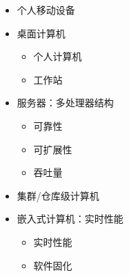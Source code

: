 \documentclass[cn, hazy, blue, normal, 12pt]{elegantnote}
\begin{document}
\begin{itemize}
    \item 个人移动设备
    \item 桌面计算机
          \begin{itemize}
              \item 个人计算机
              \item 工作站
          \end{itemize}
    \item 服务器：多处理器结构
          \begin{itemize}
              \item 可靠性
              \item 可扩展性
              \item 吞吐量
          \end{itemize}
    \item 集群/仓库级计算机
    \item 嵌入式计算机：实时性能
          \begin{itemize}
              \item 实时性能
              \item 软件固化
          \end{itemize}
\end{itemize}
\end{document}
